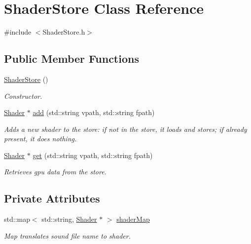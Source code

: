 \hypertarget{class_shader_store}{}\section{Shader\+Store Class Reference}
\label{class_shader_store}


{\ttfamily \#include $<$Shader\+Store.\+h$>$}

\subsection*{Public Member Functions}
\begin{DoxyCompactItemize}
\item 
\hyperlink{class_shader_store_acfd6bbef381749aa2d5d0efa6f176a14}{Shader\+Store} ()\hypertarget{class_shader_store_acfd6bbef381749aa2d5d0efa6f176a14}{}\label{class_shader_store_acfd6bbef381749aa2d5d0efa6f176a14}

\begin{DoxyCompactList}\small\item\em Constructor. \end{DoxyCompactList}\item 
\hyperlink{class_shader}{Shader} $\ast$ \hyperlink{class_shader_store_a05d990118a05385a515c06d50ee2843f}{add} (std\+::string vpath, std\+::string fpath)
\begin{DoxyCompactList}\small\item\em Adds a new shader to the store\+: if not in the store, it loads and stores; if already present, it does nothing. \end{DoxyCompactList}\item 
\hyperlink{class_shader}{Shader} $\ast$ \hyperlink{class_shader_store_ab4d641d0e399f7a4ca47a74f5ab4d66e}{get} (std\+::string vpath, std\+::string fpath)
\begin{DoxyCompactList}\small\item\em Retrieves gpu data from the store. \end{DoxyCompactList}\end{DoxyCompactItemize}
\subsection*{Private Attributes}
\begin{DoxyCompactItemize}
\item 
std\+::map$<$ std\+::string, \hyperlink{class_shader}{Shader} $\ast$ $>$ \hyperlink{class_shader_store_a23586974751c0c4fc9ce52eb3fa42985}{shader\+Map}\hypertarget{class_shader_store_a23586974751c0c4fc9ce52eb3fa42985}{}\label{class_shader_store_a23586974751c0c4fc9ce52eb3fa42985}

\begin{DoxyCompactList}\small\item\em Map translates sound file name to shader. \end{DoxyCompactList}\end{DoxyCompactItemize}


